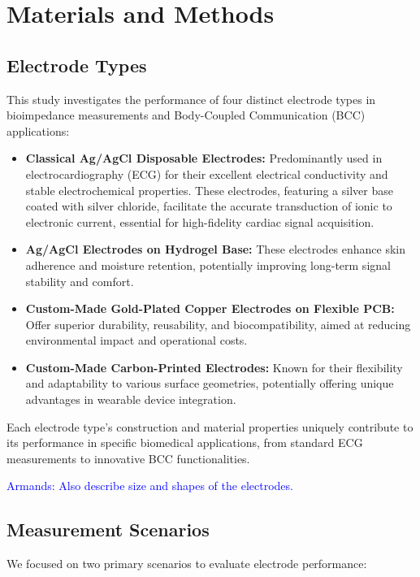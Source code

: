 \documentclass[conference]{IEEEtran}
\newcommand{\notea}[1]{\textcolor{blue}{Armands: #1}}
\begin{document}



\section{Materials and Methods}

\subsection{Electrode Types}
This study investigates the performance of four distinct electrode types in bioimpedance measurements and Body-Coupled Communication (BCC) applications:
\begin{itemize}
    \item \textbf{Classical Ag/AgCl Disposable Electrodes:} Predominantly used in electrocardiography (ECG) for their excellent electrical conductivity and stable electrochemical properties. These electrodes, featuring a silver base coated with silver chloride, facilitate the accurate transduction of ionic to electronic current, essential for high-fidelity cardiac signal acquisition.
    
    \item \textbf{Ag/AgCl Electrodes on Hydrogel Base:} These electrodes enhance skin adherence and moisture retention, potentially improving long-term signal stability and comfort.
    
    \item \textbf{Custom-Made Gold-Plated Copper Electrodes on Flexible PCB:} Offer superior durability, reusability, and biocompatibility, aimed at reducing environmental impact and operational costs.
    
    \item \textbf{Custom-Made Carbon-Printed Electrodes:} Known for their flexibility and adaptability to various surface geometries, potentially offering unique advantages in wearable device integration.
\end{itemize}

Each electrode type's construction and material properties uniquely contribute to its performance in specific biomedical applications, from standard ECG measurements to innovative BCC functionalities. 

\notea{Also describe size and shapes of the electrodes.}

\subsection{Measurement Scenarios}
We focused on two primary scenarios to evaluate electrode performance:
\end{document}
